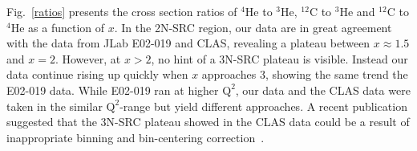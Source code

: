 Fig.~\ref{ratios} presents the cross section ratios of $\mathrm{^{4}He}$ to $\mathrm{^{3}He}$, $\mathrm{^{12}C}$ to $\mathrm{^{3}He}$
and $\mathrm{^{12}C}$ to $\mathrm{^{4}He}$ as a function of $x$. In the 2N-SRC region, our data are in great agreement with the data
from JLab E02-019 and CLAS, revealing a plateau between $x \approx 1.5$ and $x = 2$. However, at $x>2$, no hint of a 3N-SRC plateau
is visible. Instead our data continue rising up quickly when $x$ approaches 3, showing the same trend the E02-019 data. While E02-019
ran at higher $\mathrm{Q^{2}}$, our data and the CLAS data were taken in the similar $\mathrm{Q^{2}}$-range but yield different
approaches. A recent publication suggested that the 3N-SRC plateau showed in the CLAS data could be a result of inappropriate
binning and bin-centering correction~\cite{Higinbotham:2014xna}.
